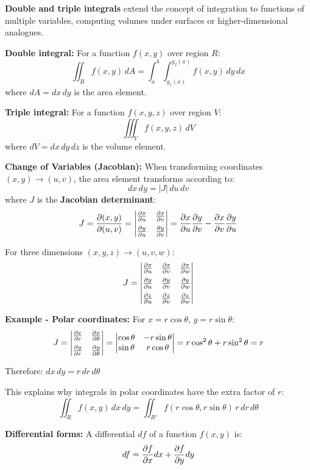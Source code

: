 \textbf{Double and triple integrals} extend the concept of integration to functions of multiple variables, computing volumes under surfaces or higher-dimensional analogues.

\textbf{Double integral:} For a function $f(x, y)$ over region $R$:
\[
\iint_R f(x, y) \, dA = \int_a^b \int_{g_1(x)}^{g_2(x)} f(x, y) \, dy \, dx
\]
where $dA = dx \, dy$ is the area element.

\textbf{Triple integral:} For a function $f(x, y, z)$ over region $V$:
\[
\iiint_V f(x, y, z) \, dV
\]
where $dV = dx \, dy \, dz$ is the volume element.

\textbf{Change of Variables (Jacobian):} When transforming coordinates $(x, y) \to (u, v)$, the area element transforms according to:
\[
dx \, dy = |J| \, du \, dv
\]
where $J$ is the \textbf{Jacobian determinant}:
\[
J = \pdv{(x, y)}{(u, v)} = \begin{vmatrix}
\pdv{x}{u} & \pdv{x}{v} \\[0.5em]
\pdv{y}{u} & \pdv{y}{v}
\end{vmatrix} = \pdv{x}{u}\pdv{y}{v} - \pdv{x}{v}\pdv{y}{u}
\]

For three dimensions $(x, y, z) \to (u, v, w)$:
\[
J = \begin{vmatrix}
\pdv{x}{u} & \pdv{x}{v} & \pdv{x}{w} \\[0.5em]
\pdv{y}{u} & \pdv{y}{v} & \pdv{y}{w} \\[0.5em]
\pdv{z}{u} & \pdv{z}{v} & \pdv{z}{w}
\end{vmatrix}
\]

\textbf{Example - Polar coordinates:} For $x = r\cos\theta$, $y = r\sin\theta$:
\[
J = \begin{vmatrix}
\pdv{x}{r} & \pdv{x}{\theta} \\[0.5em]
\pdv{y}{r} & \pdv{y}{\theta}
\end{vmatrix} = \begin{vmatrix}
\cos\theta & -r\sin\theta \\
\sin\theta & r\cos\theta
\end{vmatrix} = r\cos^2\theta + r\sin^2\theta = r
\]

Therefore: $dx \, dy = r \, dr \, d\theta$

This explains why integrals in polar coordinates have the extra factor of $r$:
\[
\iint_R f(x, y) \, dx \, dy = \iint_{R'} f(r\cos\theta, r\sin\theta) \, r \, dr \, d\theta
\]

\textbf{Differential forms:} A differential $df$ of a function $f(x, y)$ is:
\[
df = \pdv{f}{x}dx + \pdv{f}{y}dy
\]

